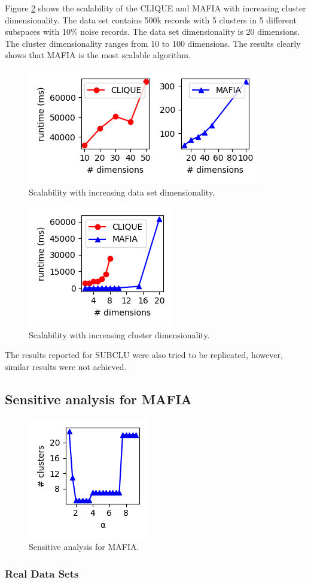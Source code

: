 Figure \ref{fig:cluster_dimensionality_vs_runtime} shows the scalability of the CLIQUE and MAFIA with increasing cluster dimensionality. The data set contains 500k records with 5 clusters in 5 different subspaces with 10\% noise records. The data set dimensionality is 20 dimensions. The cluster dimensionality ranges from 10 to 100 dimensions. The results clearly shows that MAFIA is the most scalable algorithm.
\begin{figure}
    \centering
    \includegraphics[scale=0.6]{figures/data_dimensionality_vs_runtime.png}
    \caption{Scalability with increasing data set dimensionality.}
    \label{fig:dataset_dimensionality_vs_runtime}
\end{figure}

\begin{figure}
    \centering
    \includegraphics[scale=0.6]{figures/cluster_dimensionality_vs_runtime.png}
    \caption{Scalability with increasing cluster dimensionality.}
    \label{fig:cluster_dimensionality_vs_runtime}
\end{figure}

The results reported for SUBCLU \cite{subclu} were also tried to be replicated, however, similar results were not achieved.

\subsection{Sensitive analysis for MAFIA}
\begin{figure}
    \centering
    \includegraphics[scale=0.6]{figures/sensitivity_alpha.png}
    \caption{Sensitive analysis for MAFIA.}
    \label{fig:sensitivity_alpha}
\end{figure}

\subsubsection{Real Data Sets}